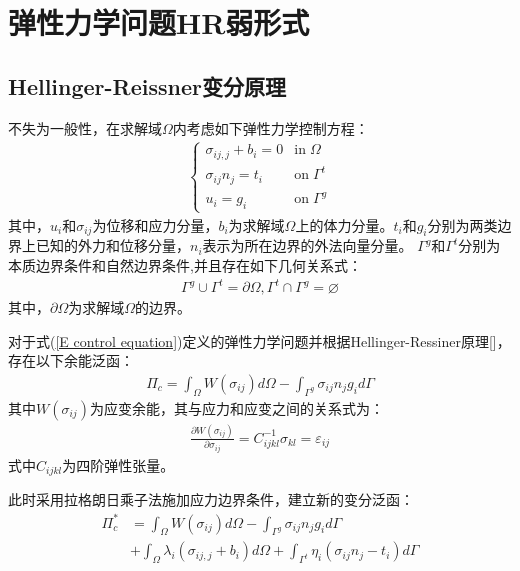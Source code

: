 \chapter{弹性力学问题HR弱形式}
\section{Hellinger-Reissner变分原理}
不失为一般性，在求解域$\Omega$内考虑如下弹性力学控制方程：
\begin{equation}\label{E control equation}
\begin{split}
\begin{cases}
    \sigma_{ij,j}+b_i=0&\text{in}\;\Omega\\
    \sigma_{ij}n_j=t_i&\text{on}\;\Gamma^t\\
    u_i=g_i&\text{on}\;\Gamma^g
\end{cases}
\end{split}
\end{equation}
其中，$u_i$和$\sigma_{ij}$为位移和应力分量，$b_i$为求解域$\Omega$上的体力分量。$t_i$和$g_i$分别为两类边界上已知的外力和位移分量，$n_i$表示为所在边界的外法向量分量。
$\Gamma^g$和$\Gamma^t$分别为本质边界条件和自然边界条件,并且存在如下几何关系式：
\begin{equation}
\begin{split}\label{Geometric relationships}
    \Gamma^g\cup\Gamma^t=\partial\Omega,\Gamma^t\cap\Gamma^g=\varnothing
\end{split}
\end{equation}
其中，$\partial\Omega$为求解域$\Omega$的边界。\par
对于式(\ref{E control equation})定义的弹性力学问题并根据Hellinger-Ressiner原理[]，存在以下余能泛函：
\begin{equation}
\begin{split}
    \Pi_c=\int_{\Omega}W(\sigma_{ij})d\Omega-\int_{\Gamma^g}\sigma_{ij}n_jg_id\Gamma
\end{split}
\end{equation}
其中$W(\sigma_{ij})$为应变余能，其与应力和应变之间的关系式为：
\begin{equation}
\begin{split}
\frac{\partial W(\sigma_{ij})}{\partial\sigma_{ij}}=C^{-1}_{ijkl}\sigma_{kl}=\varepsilon_{ij}
\end{split}
\end{equation}
式中$C_{ijkl}$为四阶弹性张量。\par
此时采用拉格朗日乘子法施加应力边界条件，建立新的变分泛函：
\begin{equation}\label{functional1}
\begin{split}
    \Pi_c^*&=\int_{\Omega}W(\sigma_{ij})d\Omega-\int_{\Gamma^g}\sigma_{ij}n_jg_id\Gamma\\
    &+\int_{\Omega}\lambda_i(\sigma_{ij,j}+b_i)d\Omega+\int_{\Gamma^t}\eta_i(\sigma_{ij}n_j-t_i)d\Gamma
\end{split}
\end{equation}
